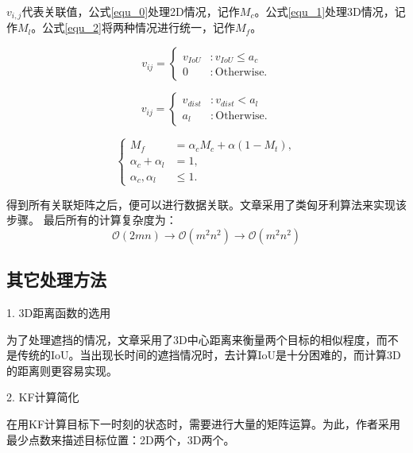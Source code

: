 \begin{tcolorbox}[]

\hspace{22pt}$v_{i,j}$代表关联值，公式\ref{equ_0}处理2D情况，记作$M_c$。公式\ref{equ_1}处理3D情况，记作$M_l$。公式\ref{equ_2}将两种情况进行统一，记作$M_f$。

\begin{equation}\label{equ_0}
	v_{ij} = 
	\begin{cases}
		v_{IoU}&:v_{IoU}\leq a_c\\
		0&:\text{Otherwise}.
	\end{cases}
\end{equation}

\begin{equation}\label{equ_1}
	v_{ij} = 
	\begin{cases}
		v_{dist} & :v_{dist} < a_l\\
		a_l & :\text{Otherwise}.
	\end{cases}
\end{equation}

\begin{equation} \label{equ_2}
\begin{cases}
	M_f &= \alpha_c M_c + \alpha (1 - M_t), \\
	\alpha_c + \alpha_l &= 1, \\
	\alpha_c , \alpha_l &\leq 1.
\end{cases}
\end{equation}

\hspace{22pt}得到所有关联矩阵之后，便可以进行数据关联。文章采用了类匈牙利算法来实现该步骤。
最后所有的计算复杂度为：
$$ \mathcal{O}(2mn) \rightarrow \mathcal{O}(m^2n^2) \rightarrow \mathcal{O}(m^2n^2) $$

\end{tcolorbox}

\subsection{其它处理方法}
1. 3D距离函数的选用

为了处理遮挡的情况，文章采用了3D中心距离来衡量两个目标的相似程度，而不是传统的IoU。当出现长时间的遮挡情况时，去计算IoU是十分困难的，而计算3D的距离则更容易实现。

2. KF计算简化

在用KF计算目标下一时刻的状态时，需要进行大量的矩阵运算。为此，作者采用最少点数来描述目标位置：2D两个，3D两个。

